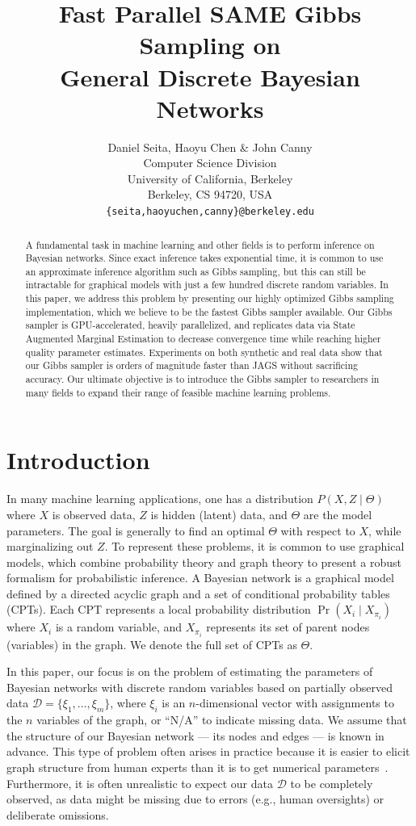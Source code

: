 \documentclass{article} %
\title{Fast Parallel SAME Gibbs Sampling on \\ General Discrete Bayesian Networks}
\author{Daniel Seita, Haoyu Chen \& John Canny \\
Computer Science Division \\
University of California, Berkeley \\
Berkeley, CS 94720, USA \\
\texttt{\{seita,haoyuchen,canny\}@berkeley.edu}
}
\begin{document}
\maketitle

\begin{abstract}
A fundamental task in machine learning and other fields is to perform inference on Bayesian
networks. Since exact inference takes exponential time, it is common to use an approximate inference
algorithm such as Gibbs sampling, but this can still be intractable for graphical models with just a
few hundred discrete random variables. In this paper, we address this problem by presenting our
highly optimized Gibbs sampling implementation, which we believe to be the fastest Gibbs sampler
available. Our Gibbs sampler is GPU-accelerated, heavily parallelized, and replicates data via State
Augmented Marginal Estimation to decrease convergence time while reaching higher quality parameter
estimates. Experiments on both synthetic and real data show that our Gibbs sampler is orders of
magnitude faster than JAGS without sacrificing accuracy. Our ultimate objective is to introduce the
Gibbs sampler to researchers in many fields to expand their range of feasible machine learning
problems.
\end{abstract}




\section{Introduction}\label{sec:intro}

In many machine learning applications, one has a distribution $P(X,Z \mid \Theta)$ where $X$ is
observed data, $Z$ is hidden (latent) data, and $\Theta$ are the model parameters. The goal is
generally to find an optimal $\Theta$ with respect to $X$, while marginalizing out $Z$. To represent
these problems, it is common to use graphical models, which combine probability theory and graph
theory to present a robust formalism for probabilistic inference. A Bayesian network is a graphical
model defined by a directed acyclic graph and a set of conditional probability tables (CPTs). Each
CPT represents a local probability distribution $\Pr(X_i \mid X_{\pi_i})$ where $X_i$ is a random
variable, and $X_{\pi_i}$ represents its set of parent nodes (variables) in the graph. We denote the
full set of CPTs as $\Theta$.

In this paper, our focus is on the problem of estimating the parameters of Bayesian networks with
discrete random variables based on partially observed data $\mathcal{D} = \{\xi_1, \ldots, \xi_m\}$,
where $\xi_i$ is an $n$-dimensional vector with assignments to the $n$ variables of the graph, or
``N/A'' to indicate missing data. We assume that the structure of our Bayesian network --- its nodes
and edges --- is known in advance. This type of problem often arises in practice because it is
easier to elicit graph structure from human experts than it is to get numerical
parameters~\citep{Koller2009}. Furthermore, it is often unrealistic to expect our data $\mathcal{D}$
to be completely observed, as data might be missing due to errors (e.g., human oversights) or
deliberate omissions.
\end{document}
